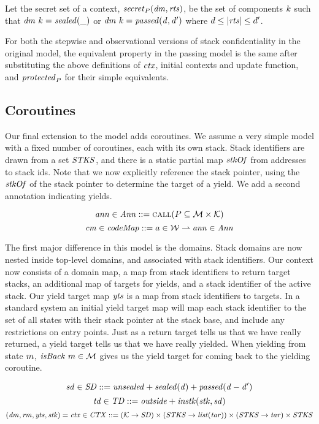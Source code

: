 \documentclass[acmsmall,review,anonymous]{acmart}\settopmatter{printfolios=true,printccs=false,printacmref=false}
\begin{document}
{ Let the secret set of a context, \(\mathit{secret}_P(\mathit{dm},\mathit{rts})\),
be the set of components \(k\) such that
\(\mathit{dm} ~ k = \mathit{sealed(\mbox{\_})}\) or
\(\mathit{dm} ~ k = \mathit{passed(d,d')}\)
where \(d \leq |\mathit{rts}| \leq d'\).

For both the stepwise and observational versions of stack confidentiality in
the original model, the equivalent property in the passing model is the same after
substituting the above definitions of \(\mathit{ctx}\), initial contexts and update
function, and \(\mathit{protected}_P\) for their simple equivalents.

\subsection{Coroutines}

Our final extension to the model adds coroutines. We assume a very simple model with
a fixed number of coroutines, each with its own stack.
Stack identifiers are drawn from a set \(\mathit{STKS}\), and there is a static partial map
\(\mathit{stkOf}\) from addresses to stack ids. Note that we now explicitly reference the stack
pointer, using the \(\mathit{stkOf}\) of the stack pointer to determine the target of a yield.
We add a second annotation indicating yields.

\[\mathit{ann} \in \mathit{Ann} ::= \text{\sc call}(P \subseteq {\mathcal M} \times {\mathcal K})\]
\[\mathit{cm} \in \mathit{codeMap} ::= a \in {\mathcal W} \rightharpoonup \mathit{ann} \in \mathit{Ann}\]

The first major difference in this model is the domains. Stack domains are now nested inside
top-level domains, and associated with stack identifiers.
Our context now consists of a domain map, a map from stack identifiers to return target stacks,
an additional map of targets for yields, and a stack identifier of the active stack.
Our yield target map \(\mathit{yts}\) is a map from stack identifiers to targets.
In a standard system an initial yield target map will map each stack identifier to the
set of all states with their stack pointer at the stack base, and include any restrictions
on entry points. Just as a return target tells us that we have really returned, a yield
target tells us that we have really yielded. When yielding from state \(m\),
\(\mathit{isBack} ~ m \in {\mathcal M}\) gives us the yield target for coming back to the yielding
coroutine.

\[\mathit{sd} \in \mathit{SD} ::= \mathit{unsealed} + \mathit{sealed(d)} + \mathit{passed(d-d')}\]
\[\mathit{td} \in \mathit{TD} ::= \mathit{outside} + \mathit{instk}(\mathit{stk},\mathit{sd})\]
\[(\mathit{dm},\mathit{rm},\mathit{yts},\mathit{stk}) = \mathit{ctx} \in \mathit{CTX} ::= 
 ({\mathcal K} \rightarrow \mathit{SD}) \times
(\mathit{STKS} \rightarrow \mathit{list}(\mathit{tar})) \times (\mathit{STKS} \rightarrow \mathit{tar}) \times \mathit{STKS}\]

}
\end{document}
